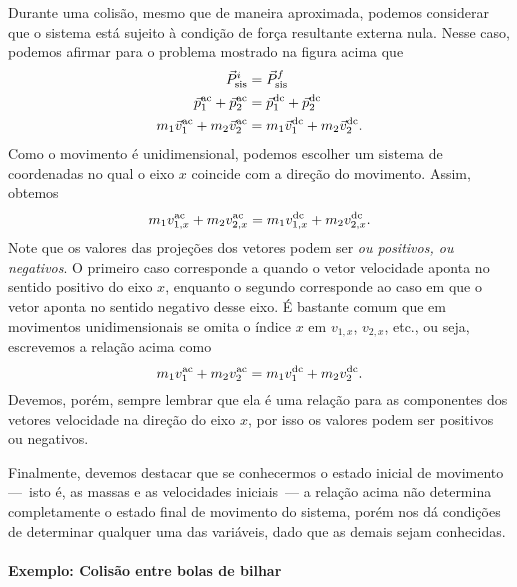 Durante uma colisão, mesmo que de maneira aproximada, podemos considerar que o sistema está sujeito à condição de força resultante externa nula. Nesse caso, podemos afirmar para o problema mostrado na figura acima que
\begin{align}
    \vec{P}_{\rm{sis}}^i &= \vec{P}_{\rm{sis}}^f \\
    \vec{p}_{1}^{\rm{ac}} + \vec{p}_2^{\rm{ac}} &= \vec{p}_{1}^{\rm{dc}} + \vec{p}_{2}^{\rm{dc}} \\
    m_1 \vec{v}_1^{\rm{ac}} + m_2 \vec{v}_2^{\rm{ac}} &= m_1 \vec{v}_1^{\rm{dc}} + m_2 \vec{v}_2^{\rm{dc}}.
\end{align}
%
Como o movimento é unidimensional, podemos escolher um sistema de coordenadas no qual o eixo $x$ coincide com a direção do movimento. Assim, obtemos
\begin{equation}
     m_1 v_{1,x}^{\rm{ac}} + m_2 v_{2,x}^{\rm{ac}} = m_1 v_{1,x}^{\rm{dc}} + m_2 v_{2,x}^{\rm{dc}}. \label{Eq:ConservacaoMomentoUnidimensional}
\end{equation}
%
Note que os valores das projeções dos vetores podem ser \emph{ou positivos, ou negativos}. O primeiro caso corresponde a quando o vetor velocidade aponta no sentido positivo do eixo $x$, enquanto o segundo corresponde ao caso em que o vetor aponta no sentido negativo desse eixo. É bastante comum que em movimentos unidimensionais se omita o índice $x$ em $v_{1,x}$, $v_{2,x}$, etc., ou seja, escrevemos a relação acima como
\begin{equation}
     m_1 v_{1}^{\rm{ac}} + m_2 v_{2}^{\rm{ac}} = m_1 v_{1}^{\rm{dc}} + m_2 v_{2}^{\rm{dc}}.
\end{equation}
%
Devemos, porém, sempre lembrar que ela é uma relação para as componentes dos vetores velocidade na direção do eixo $x$, por isso os valores podem ser positivos ou negativos.

Finalmente, devemos destacar que se conhecermos o estado inicial de movimento ---~isto é, as massas e as velocidades iniciais~--- a relação acima não determina completamente o estado final de movimento do sistema, porém nos dá condições de determinar qualquer uma das variáveis, dado que as demais sejam conhecidas.

\paragraph{Exemplo: Colisão entre bolas de bilhar}

